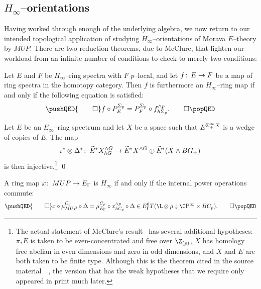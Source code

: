 \subsection*{\(H_\infty\)--orientations}

Having worked through enough of the underlying algebra, we now return to our intended topological application of studying \(H_\infty\)--orientations of Morava \(E\)--theory by \(MUP\).  There are two reduction theorems, due to McClure, that lighten our workload from an infinite number of conditions to check to merely two conditions:

\begin{theorem}
Let \(E\) and \(F\) be \(H_\infty\)--ring spectra with \(F\) \(p\)--local, and let \(f\colon\thinspace E \to F\) be a map of ring spectra in the homotopy category.  Then \(f\) is furthermore an \(H_\infty\)--ring map if and only if the following equation is satisfied:
\[
\pushQED{\qed}
f \circ P^{\Sigma_p}_E = P^{\Sigma_p}_F \circ f^{\sm p}_{h\Sigma_p}. \qedhere
\popQED
\]
\end{theorem}

\begin{theorem}
Let \(E\) be an \(E_\infty\)--ring spectrum and let \(X\) be a space such that \(E^{\Sigma^\infty_+ X}\) is a wedge of copies of \(E\).  The map \[\iota^* \otimes \Delta^*\colon\thinspace \widetilde E^* X^{\wedge G}_{hG} \to \widetilde E^* X^{\wedge G} \oplus \widetilde E^*(X \wedge BG_+)\] is then injective.\footnote{The actual statement of McClure's result~\cite[Proposition VIII.7.3]{BMMS} has several additional hypotheses: \(\pi_* E\) is taken to be even-concentrated and free over \(\Z_{(p)}\), \(X\) has homology free abelian in even dimensions and zero in odd dimensions, and \(X\) and \(E\) are both taken to be finite type.  Although this is the theorem cited in the source material~\cite[Section 4]{Ando}~\cite[Proof of Proposition 6.1]{AHSHinfty}, the version that has the weak hypotheses that we require only appeared in print much later.} \qed
\end{theorem}

\begin{corollary}
A ring map \(x\colon\thinspace MUP \to E_\Gamma\) is \(H_\infty\) if and only if the internal power operations commute: \[
\pushQED{\qed}
x \circ \mu^{C_p}_{MUP} \circ \Delta = \mu^{C_p}_{E_\Gamma} \circ x^{\sm p}_{hC_p} \circ \Delta \in E_\Gamma^0 T(\L \otimes \rho \downarrow \CP^\infty \times BC_p).
\qedhere
\popQED
\]
\end{corollary}

